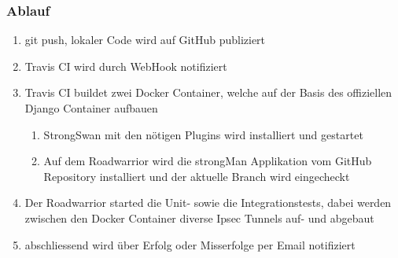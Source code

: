 \subsubsection{Ablauf}
\begin{enumerate}
	\item git push, lokaler Code wird auf GitHub publiziert
	\item Travis CI wird durch WebHook notifiziert
	\item Travis CI buildet zwei Docker Container, welche auf der Basis des offiziellen Django Container aufbauen 
	\begin{enumerate}
         \item StrongSwan mit den nötigen Plugins wird installiert und gestartet
         \item Auf dem Roadwarrior wird die strongMan Applikation vom GitHub Repository installiert und der aktuelle Branch wird eingecheckt
      \end{enumerate}
      \item Der Roadwarrior started die Unit- sowie die Integrationstests, dabei werden zwischen den Docker Container diverse Ipsec Tunnels auf- und abgebaut
      \item abschliessend wird über Erfolg oder Misserfolge per Email notifiziert
\end{enumerate}
